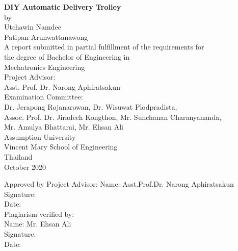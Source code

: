 \documentclass[12pt]{article}
\begin{document}
\begin{titlepage}
	\begin{center}
		
		{\bfseries DIY Automatic Delivery Trolley} \\
		[1cm]
		by \\
		[1cm]
		Utchawin Namdee\\ 
		\medskip
		Patipan Arunwattanawong \\
		[1cm]
		A report submitted in partial fulfillment of the requirements for \\
		the degree of Bachelor of Engineering in \\
		Mechatronics Engineering \\
		[1cm]
		Project Advisor:\\
		\medskip
		Asst. Prof. Dr. Narong Aphiratsakun \\
		[1cm]
		Examination Committee: \\
		\medskip
		Dr. Jerapong Rojanarowan, Dr. Wisuwat Plodpradista, \\
		Assoc. Prof. Dr. Jiradech Kongthon, Mr. Sunchanan Charanyananda, \\
		Mr. Amulya Bhattarai, Mr. Ehsan Ali \\
		[1cm]
		Assumption University \\
		Vincent Mary School of Engineering\\
		Thailand \\
		October 2020 \\
		
	\end{center}
\end{titlepage}

\newpage
\thispagestyle{empty}

\noindent Approved by Project Advisor:\newline
\hspace*{7cm} Name: Asst.Prof.Dr. Narong Aphiratsakun \\
\hspace*{7cm} Signature:\\
\hspace*{7cm} Date:\hrulefill \\
[1cm]
Plagiarism verified by: \\
\hspace*{7cm} Name: Mr. Ehsan Ali \\
\hspace*{7cm} Signature: \\
\hspace*{7cm} Date:\hrulefill \\
\end{document}
